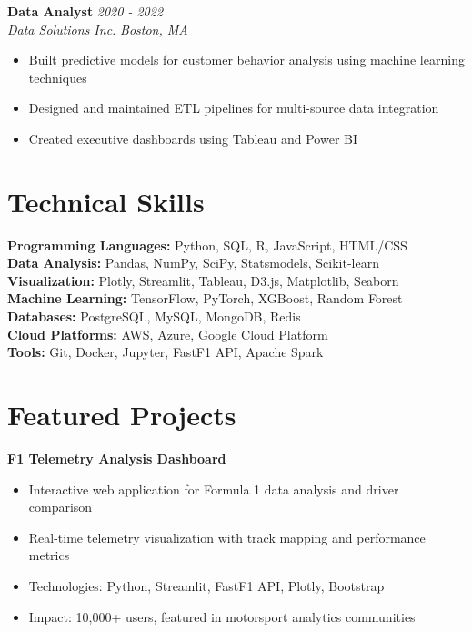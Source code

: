 \documentclass[letterpaper,11pt]{article}
\begin{document}
\textbf{Data Analyst} \hfill \textit{2020 - 2022}\\
\textit{Data Solutions Inc.} \hfill \textit{Boston, MA}
\begin{itemize}[leftmargin=0.5in]
    \item Built predictive models for customer behavior analysis using machine learning techniques
    \item Designed and maintained ETL pipelines for multi-source data integration
    \item Created executive dashboards using Tableau and Power BI
\end{itemize}

\section*{\textcolor{primarycolor}{Technical Skills}}

\textbf{Programming Languages:} Python, SQL, R, JavaScript, HTML/CSS\\
\textbf{Data Analysis:} Pandas, NumPy, SciPy, Statsmodels, Scikit-learn\\
\textbf{Visualization:} Plotly, Streamlit, Tableau, D3.js, Matplotlib, Seaborn\\
\textbf{Machine Learning:} TensorFlow, PyTorch, XGBoost, Random Forest\\
\textbf{Databases:} PostgreSQL, MySQL, MongoDB, Redis\\
\textbf{Cloud Platforms:} AWS, Azure, Google Cloud Platform\\
\textbf{Tools:} Git, Docker, Jupyter, FastF1 API, Apache Spark

\section*{\textcolor{primarycolor}{Featured Projects}}

\textbf{F1 Telemetry Analysis Dashboard}
\begin{itemize}[leftmargin=0.5in]
    \item Interactive web application for Formula 1 data analysis and driver comparison
    \item Real-time telemetry visualization with track mapping and performance metrics
    \item Technologies: Python, Streamlit, FastF1 API, Plotly, Bootstrap
    \item Impact: 10,000+ users, featured in motorsport analytics communities
\end{itemize}
\end{document}
